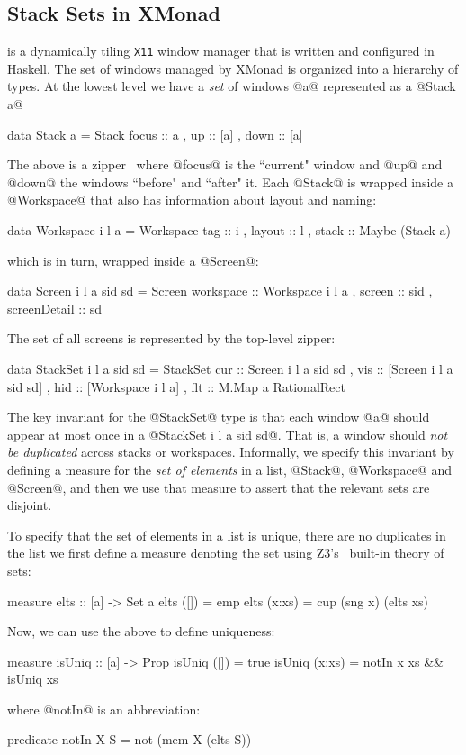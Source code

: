 \subsection{Stack Sets in XMonad}\label{sec:xmonad}

\lbxmonad is a dynamically tiling \texttt{X11} 
window manager that is written and configured in Haskell. 
The set of windows managed by XMonad is organized into a
hierarchy of types. At the lowest level we have a 
\emph{set} of windows @a@ represented as a @Stack a@
%
\begin{code}
  data Stack a = Stack { focus :: a   
                       , up    :: [a] 
                       , down  :: [a] }
\end{code}
%
The above is a zipper~\cite{zipper} where @focus@ is the 
``current" window and @up@ and @down@ the windows ``before"
and ``after" it.
%
Each @Stack@ is wrapped inside a @Workspace@ that also has
information about layout and naming:
%
\begin{code}
  data Workspace i l a = Workspace 
     { tag    :: i
     , layout :: l
     , stack  :: Maybe (Stack a) }
\end{code}
%
which is in turn, wrapped inside a @Screen@:
%
\begin{code}
  data Screen i l a sid sd = Screen 
    { workspace    :: Workspace i l a
    , screen       :: sid
    , screenDetail :: sd }
\end{code}
%
The set of all screens is represented by the top-level zipper:
%
\begin{code}
  data StackSet i l a sid sd = StackSet 
    { cur :: Screen i l a sid sd  
    , vis :: [Screen i l a sid sd]
    , hid :: [Workspace i l a]   
    , flt :: M.Map a RationalRect } 
\end{code}


The key invariant for the @StackSet@ type is that each window @a@
should appear at most once in a @StackSet i l a sid sd@. That is,
a window should \emph{not be duplicated} across stacks or workspaces.
Informally, we specify this invariant by defining a measure for the 
\emph{set of elements} in a list, @Stack@, @Workspace@ and @Screen@,
and then we use that measure to assert that the relevant sets are 
disjoint.

 To specify that the set of elements
in a list is unique, \ie there are no duplicates in the list we first define
a measure denoting the set using Z3's~\citep{z3} built-in theory of sets:
%
\begin{code}
  measure elts :: [a] -> Set a 
  elts ([])   = emp  
  elts (x:xs) = cup (sng x) (elts xs) 
\end{code}
%
Now, we can use the above to define uniqueness:
%
\begin{code}
  measure isUniq :: [a] -> Prop 
  isUniq ([])   =  true 
  isUniq (x:xs) =  notIn x xs && isUniq xs
\end{code}
%
where @notIn@ is an abbreviation: 
%
\begin{code}
  predicate notIn X S = not (mem X (elts S))
\end{code}

